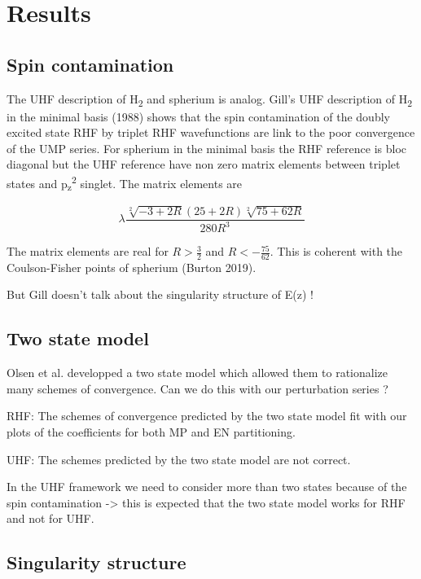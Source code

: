 \documentclass{article}
\begin{document}
\section{Results}

\subsection{Spin contamination}
The UHF description of H\textsubscript{2} and spherium is analog. Gill's UHF description of H\textsubscript{2} in the minimal basis (1988) shows that the spin contamination of the doubly excited state RHF by triplet RHF wavefunctions are link to the poor convergence of the UMP series. 
For spherium in the minimal basis the RHF reference is bloc diagonal but the UHF reference have non zero matrix elements between triplet states and p\textsubscript{z}\textsuperscript{2} singlet. The matrix elements are

\begin{equation}
\lambda\frac{\sqrt[2]{-3+2R}(25+2R)\sqrt[2]{75+62R}}{280 R^{3}}
\end{equation}

The matrix elements are real for $R>\frac{3}{2}$ and $R<-\frac{75}{62}$. This is coherent with the Coulson-Fisher points of spherium (Burton 2019).

But Gill doesn't talk about the singularity structure of E(z) !

\subsection{Two state model}

Olsen et al. developped a two state model which allowed them to rationalize many schemes of convergence. Can we do this with our perturbation series ? 

RHF: The schemes of convergence predicted by the two state model fit with our plots of the coefficients for both MP and EN partitioning.

UHF: The schemes predicted by the two state model are not correct. 

In the UHF framework we need to consider more than two states because of the spin contamination -> this is expected that the two state model works for RHF and not for UHF.

\subsection{Singularity structure}
\end{document}
